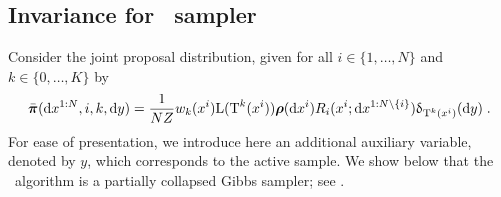 \subsection{Invariance for \IFIS\ sampler}
\label{subsec:partial-collapsed-infine}
Consider the joint proposal distribution, given for all $i \in \{1,\dots,N\}$ and $k \in \{0,\dots, K\}$ by
\begin{equation}
\label{eq:joint-distribution}
\bar{\boldsymbol{\pi}}(\mathrm{d} x^{1:N},i,k,\mathrm{d} y)= \frac{1}{N Z} w_k(x^i) \mathrm{L}(\operatorname{T}^k(x^i)) \boldsymbol{\rho}(\mathrm{d} x^i) R_i(x^i;\mathrm{d} x^{1:N \setminus \{i\}}) \updelta_{\operatorname{T}^k(x^i)} (\mathrm{d} y)\;.
\end{equation}
For ease of presentation, we introduce here an additional auxiliary variable, denoted by $y$, which corresponds to the active sample. We show below that the \IFIS\ algorithm is a partially collapsed Gibbs sampler; see \cite{vandyk:park:2008}.

